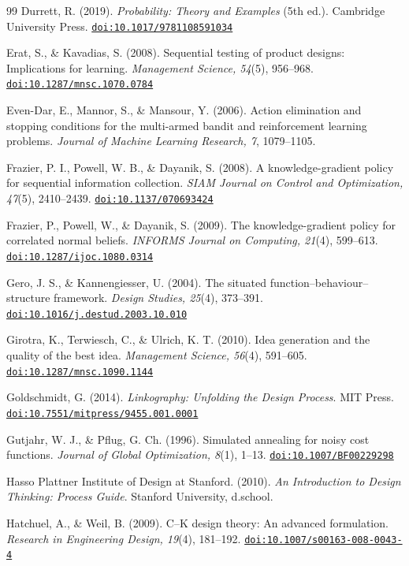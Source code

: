 \documentclass[preprint,review,11pt,authoryear]{elsarticle}
\providecommand{\doi}[1]{\href{https://doi.org/#1}{\nolinkurl{doi:#1}}}
\theoremstyle{definition}
\begin{document}
\begin{thebibliography}{99}
 Durrett, R. (2019). \textit{Probability: Theory and Examples} (5th ed.). Cambridge University Press. \doi{10.1017/9781108591034}

 Erat, S., \& Kavadias, S. (2008). Sequential testing of product designs: Implications for learning. \textit{Management Science, 54}(5), 956--968. \doi{10.1287/mnsc.1070.0784}

 Even-Dar, E., Mannor, S., \& Mansour, Y. (2006). Action elimination and stopping conditions for the multi-armed bandit and reinforcement learning problems. \textit{Journal of Machine Learning Research, 7}, 1079--1105.

 Frazier, P. I., Powell, W. B., \& Dayanik, S. (2008). A knowledge-gradient policy for sequential information collection. \textit{SIAM Journal on Control and Optimization, 47}(5), 2410--2439. \doi{10.1137/070693424}

 Frazier, P., Powell, W., \& Dayanik, S. (2009). The knowledge-gradient policy for correlated normal beliefs. \textit{INFORMS Journal on Computing, 21}(4), 599--613. \doi{10.1287/ijoc.1080.0314}

 Gero, J. S., \& Kannengiesser, U. (2004). The situated function--behaviour--structure framework. \textit{Design Studies, 25}(4), 373--391. \doi{10.1016/j.destud.2003.10.010}

 Girotra, K., Terwiesch, C., \& Ulrich, K. T. (2010). Idea generation and the quality of the best idea. \textit{Management Science, 56}(4), 591--605. \doi{10.1287/mnsc.1090.1144}

 Goldschmidt, G. (2014). \textit{Linkography: Unfolding the Design Process}. MIT Press. \doi{10.7551/mitpress/9455.001.0001}

 Gutjahr, W. J., \& Pflug, G. Ch. (1996). Simulated annealing for noisy cost functions. \textit{Journal of Global Optimization, 8}(1), 1--13. \doi{10.1007/BF00229298}

 Hasso Plattner Institute of Design at Stanford. (2010). \textit{An Introduction to Design Thinking: Process Guide}. Stanford University, d.school.

 Hatchuel, A., \& Weil, B. (2009). C--K design theory: An advanced formulation. \textit{Research in Engineering Design, 19}(4), 181--192. \doi{10.1007/s00163-008-0043-4}


\end{thebibliography}
\end{document}
